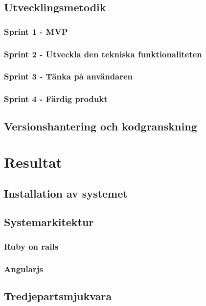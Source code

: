 \documentclass[a4paper,12pt,oneside,final]{extbook}
\begin{document}
\section{Utvecklingsmetodik}

\subsection{Sprint 1 - MVP}

\subsection{Sprint 2 - Utveckla den tekniska funktionaliteten}

\subsection{Sprint 3 - Tänka på användaren}

\subsection{Sprint 4 - Färdig produkt}

\section{Versionshantering och kodgranskning}

\chapter{Resultat}

\section{Installation av systemet}

\section{Systemarkitektur}

\subsection{Ruby on rails}

\subsection{Angularjs}

\section{Tredjepartsmjukvara}
\end{document}
